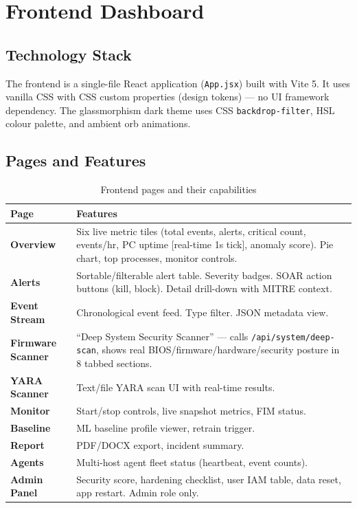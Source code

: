 \documentclass[12pt,a4paper]{article}
\begin{document}
\section{Frontend Dashboard}

\subsection{Technology Stack}

The frontend is a single-file React application (\texttt{App.jsx}) built with Vite 5.
It uses vanilla CSS with CSS custom properties (design tokens) — no UI framework dependency.
The glassmorphism dark theme uses CSS \texttt{backdrop-filter}, HSL colour palette,
and ambient orb animations.

\subsection{Pages and Features}

\begin{table}[H]
\centering
\begin{tabularx}{\linewidth}{lX}
\toprule
\textbf{Page} & \textbf{Features} \\
\midrule
\textbf{Overview} & Six live metric tiles (total events, alerts, critical count,
    events/hr, PC uptime [real-time 1s tick], anomaly score). Pie chart, top processes,
    monitor controls. \\
\textbf{Alerts} & Sortable/filterable alert table. Severity badges. SOAR action buttons
    (kill, block). Detail drill-down with MITRE context. \\
\textbf{Event Stream} & Chronological event feed. Type filter. JSON metadata view. \\
\textbf{Firmware Scanner} & ``Deep System Security Scanner'' — calls \texttt{/api/system/deep-scan},
    shows real BIOS/firmware/hardware/security posture in 8 tabbed sections. \\
\textbf{YARA Scanner} & Text/file YARA scan UI with real-time results. \\
\textbf{Monitor} & Start/stop controls, live snapshot metrics, FIM status. \\
\textbf{Baseline} & ML baseline profile viewer, retrain trigger. \\
\textbf{Report} & PDF/DOCX export, incident summary. \\
\textbf{Agents} & Multi-host agent fleet status (heartbeat, event counts). \\
\textbf{Admin Panel} & Security score, hardening checklist, user IAM table,
    data reset, app restart. Admin role only. \\
\bottomrule
\end{tabularx}
\caption{Frontend pages and their capabilities}
\end{table}
\end{document}
